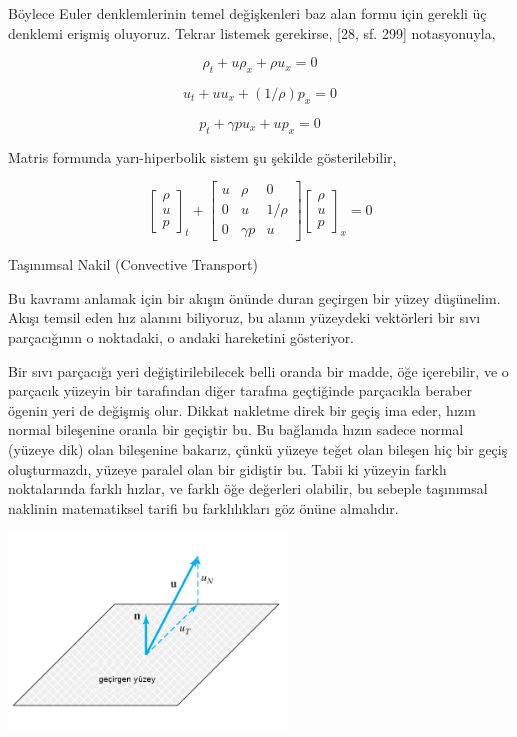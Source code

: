 \documentclass[12pt,fleqn]{article}\usepackage{../../common}
\begin{document}
Böylece Euler denklemlerinin temel değişkenleri baz alan formu için gerekli üç
denklemi erişmiş oluyoruz. Tekrar listemek gerekirse, [28, sf. 299] notasyonuyla,

$$
\rho_t + u \rho_x + \rho u_x = 0
$$

$$
u_t + uu_x + (1/\rho) p_x = 0
$$

$$
p_t + \gamma p u_x + u p_x = 0
$$

Matris formunda yarı-hiperbolik sistem şu şekilde gösterilebilir,

$$
\left[\begin{array}{c}
\rho \\ u \\ p
\end{array}\right]_t +
\left[\begin{array}{ccc}
u & \rho & 0 \\
0 & u & 1/\rho \\
0 & \gamma p & u
\end{array}\right]
\left[\begin{array}{c}
\rho \\ u \\ p
\end{array}\right]_x
= 0
$$

Taşınımsal Nakil (Convective Transport)

Bu kavramı anlamak için bir akışın önünde duran geçirgen bir yüzey
düşünelim. Akışı temsil eden hız alanını biliyoruz, bu alanın yüzeydeki
vektörleri bir sıvı parçacığının o noktadaki, o andaki hareketini gösteriyor.

Bir sıvı parçacığı yeri değiştirilebilecek belli oranda bir madde, öğe
içerebilir, ve o parçacık yüzeyin bir tarafından diğer tarafına geçtiğinde
parçacıkla beraber ögenin yeri de değişmiş olur. Dikkat nakletme direk bir
geçiş ima eder, hızın normal bileşenine oranla bir geçiştir bu. Bu bağlamda
hızın sadece normal (yüzeye dik) olan bileşenine bakarız, çünkü yüzeye
teğet olan bileşen hiç bir geçiş oluşturmazdı, yüzeye paralel olan bir
gidiştir bu. Tabii ki yüzeyin farklı noktalarında farklı hızlar, ve farklı
öğe değerleri olabilir, bu sebeple taşınımsal naklinin matematiksel
tarifi bu farklılıkları göz önüne almalıdır. 

\includegraphics[width=20em]{phy_030_fluid2_04.png}
\end{document}
